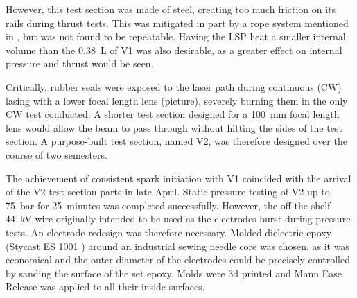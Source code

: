 However, this test section was made of steel, creating too much friction on its rails during thrust tests. This was mitigated in part by a rope system mentioned in \textcite{duplayArgonLaserPlasmaThruster2024a}, but was not found to be repeatable. Having the LSP heat a smaller internal volume than the \qty{0.38}{L} of V1 was also desirable, as a greater effect on internal pressure and thrust would be seen.

Critically, rubber seals were exposed to the laser path during continuous (CW) lasing with a lower focal length lens (picture), severely burning them in the only CW test conducted. A shorter test section designed for a \qty{100}{mm} focal length lens would allow the beam to pass through without hitting the sides of the test section. A purpose-built test section, named V2, was therefore designed over the course of two semesters. 

The achievement of consistent spark initiation with V1 coincided with the arrival of the V2 test section parts in late April. Static pressure testing of V2 up to \qty{75}{bar} for \qty{25}{minutes} was completed successfully. However, the off-the-shelf \qty{44}{kV} wire originally intended to be used as the electrodes burst during pressure tests. An electrode redesign was therefore necessary. Molded dielectric epoxy (Stycast ES 1001 \textcite{McMasterCarr}) around an industrial sewing needle core was chosen, as it was economical and the outer diameter of the electrodes could be precisely controlled by sanding the surface of the set epoxy. Molds were 3d printed and Mann Ease Release was applied to all their inside surfaces.

